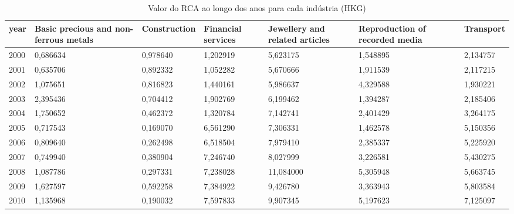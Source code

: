 \begin{table}
\centering
\caption{Valor do RCA ao longo dos anos para cada indústria (HKG)}
\begin{tabular}{p{1cm}p{2cm}p{2cm}p{2cm}p{2cm}p{2cm}p{2cm}}
\toprule
 year &  Basic precious and non-ferrous metals &  Construction &  Financial services &  Jewellery and related articles &  Reproduction of recorded media &  Transport \\
\midrule
 2000 &                               0,686634 &      0,978640 &            1,202919 &                        5,623175 &                        1,548895 &   2,134757 \\
 2001 &                               0,635706 &      0,892332 &            1,052282 &                        5,670666 &                        1,911539 &   2,117215 \\
 2002 &                               1,075651 &      0,816823 &            1,440161 &                        5,986637 &                        4,329588 &   1,930221 \\
 2003 &                               2,395436 &      0,704412 &            1,902769 &                        6,199462 &                        1,394287 &   2,185406 \\
 2004 &                               1,750652 &      0,462372 &            1,320784 &                        7,142741 &                        2,401429 &   3,264175 \\
 2005 &                               0,717543 &      0,169070 &            6,561290 &                        7,306331 &                        1,462578 &   5,150356 \\
 2006 &                               0,809640 &      0,262498 &            6,518504 &                        7,979410 &                        2,385337 &   5,225920 \\
 2007 &                               0,749940 &      0,380904 &            7,246740 &                        8,027999 &                        3,226581 &   5,430275 \\
 2008 &                               1,087786 &      0,297331 &            7,238028 &                       11,084000 &                        5,305948 &   5,663745 \\
 2009 &                               1,627597 &      0,592258 &            7,384922 &                        9,426780 &                        3,363943 &   5,803584 \\
 2010 &                               1,135968 &      0,190032 &            7,597833 &                        9,907345 &                        5,197623 &   7,125097 \\

\end{tabular}
\end{table}
